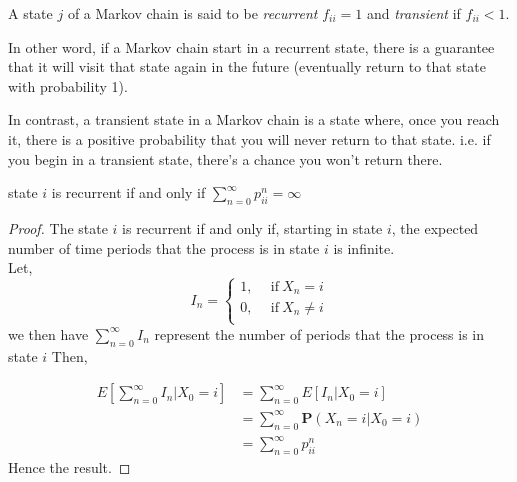 \begin{definition}
    A state $ j $ of a Markov chain is said to be \textit{recurrent}  $ f_{ii}=1 $ and \textit{transient}  if $ f_{ii}<1 $.
\end{definition}

In other word, if a Markov chain start in a recurrent state, there is a guarantee that it will visit that state again in the future
(eventually return to that state with probability 1).

In contrast, a transient state in a Markov chain is a state where, once you reach it, 
there is a positive probability that you will never return to that state.
i.e. if you begin in a transient state, there's a chance you won't return there.

\begin{corollary}
    \label{recurrent}
    state $ i $ is recurrent if and only if  $ \sum_{n=0}^{\infty} p^{n}_{ii}=\infty $
\end{corollary}
\begin{proof}
    The state $ i $ is recurrent if and only if, starting in state  $ i $, the expected number of time periods that the 
    process is in state  $ i $ is infinite. \\ 
    Let, 
    \[
        I_{n} =
        \begin{cases}
            1, \ \ &\text{if}\ X_{n} = i\\ 
            0, \ \ &\text{if}\ X_{n} \neq  i\\ 
        \end{cases}
    \]
    we then have $ \sum_{n=0}^{\infty} I_{n} $ represent the number of periods that the process is in state $ i $ Then,

    \begin{align*}
        E\left[\sum_{n=0}^{\infty} I_{n}|X_{0}=i\right]&= \sum_{n=0}^{\infty} E[I_{n}|X_{0}=i] \\
        &= \sum_{n=0}^{\infty} \mathbf{P}(X_{n}=i|X_{0}=i) \\
        &= \sum_{n=0}^{\infty} p^{n}_{ii} 
    \end{align*}
    Hence the result.
\end{proof}

